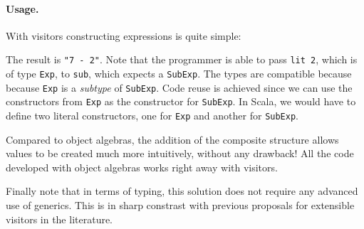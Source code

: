 
\paragraph{Usage.} With visitors constructing expressions is quite simple:

\begin{comment}
  \begin{lstlisting}{language=F2J}
    e2 = sub (lit 7) (lit 2)
  \end{lstlisting}
\end{comment}
The result is \lstinline$"7 - 2"$. Note that the programmer is able to pass \lstinline{lit 2}, which is of type \lstinline{Exp},
to \lstinline{sub}, which expects a \lstinline{SubExp}. The types are compatible
because because \lstinline$Exp$ is a \emph{subtype} of \lstinline$SubExp$. Code
reuse is achieved since we can use the constructors from \lstinline$Exp$ as the
constructor for \lstinline$SubExp$. In Scala, we would have to define two
literal constructors, one for \lstinline$Exp$ and another for
\lstinline$SubExp$.

Compared to object algebras, the addition of the composite structure
allows values to be created much more intuitively, without any
drawback! All the code developed with object algebras works right
away with visitors.

Finally note that in terms of typing, this solution does not require
any advanced use of generics. This is in sharp constrast with previous
proposals for extensible visitors in the literature.




